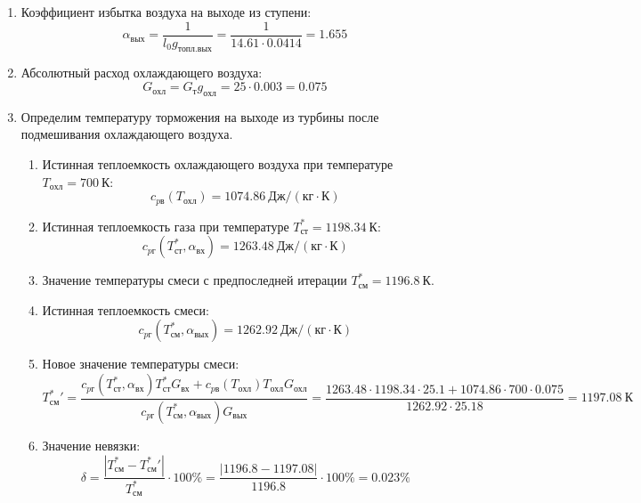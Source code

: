 \documentclass[a4paper,10pt]{article}
\begin{document}
\begin{enumerate}
        \item Коэффициент избытка воздуха на выходе из ступени:
        \[
            \alpha_{вых} = \frac{ 1 }{ l_0 g_{топл.вых} } =
                \frac{ 1 }{ 14.61 \cdot 0.0414 } =
            1.655
        \]

        \item Абсолютный расход охлаждающего воздуха:
        \[
            G_{охл} = G_т g_{охл} = 25 \cdot 0.003 =
            0.075
        \]

        \item Определим температуру торможения на выходе из турбины после подмешивания охлаждающего воздуха.
        \begin{enumerate}

            \item Истинная теплоемкость охлаждающего воздуха при температуре $T_{охл} = 700\ К $:
            \[
                c_{pв} (T_{охл}) = 1074.86\ Дж/ (кг \cdot К)
            \]

            \item Истинная теплоемкость газа при температуре $T_{ст}^* = 1198.34 \ К $:
            \[
                c_{pг} (T_{ст}^*, \alpha_{вх}) =
                1263.48\ Дж/ (кг \cdot К)
            \]

            \item Значение температуры смеси с предпоследней итерации $T_{см}^{*} = 1196.8\ К$.

            \item Истинная теплоемкость смеси:
            \[
                c_{pг} (T_{см}^{*}, \alpha_{вых}) =
                1262.92\ Дж/ (кг \cdot К)
            \]

            \item Новое значение температуры смеси:
            \[
                T_{см}^*\prime = \frac{
                        c_{pг} (T_{ст}^*, \alpha_{вх}) T_{ст}^* G_{вх} + c_{pв} (T_{охл}) T_{охл} G_{охл}
                    }{
                        c_{pг} (T_{см}^{*}, \alpha_{вых}) G_{вых}
                    } =
                \frac{
                    1263.48
                    \cdot 1198.34 \cdot 25.1 +
                    1074.86
                    \cdot 700 \cdot 0.075
                }{
                    1262.92
                    \cdot  25.18
                } =
                1197.08\ К
            \]

            \item Значение невязки:
            \[
                \delta = \frac{ \left| T_{см}^{*} - T_{см}^*\prime \right| }{T_{см}^{*}} \cdot 100 \% =
                    \frac{
                        \left| 1196.8 - 1197.08 \right|
                    }{
                        1196.8
                    } \cdot 100 \% =
                0.023 \%
            \]


\end{enumerate}
\end{enumerate}
\end{document}
